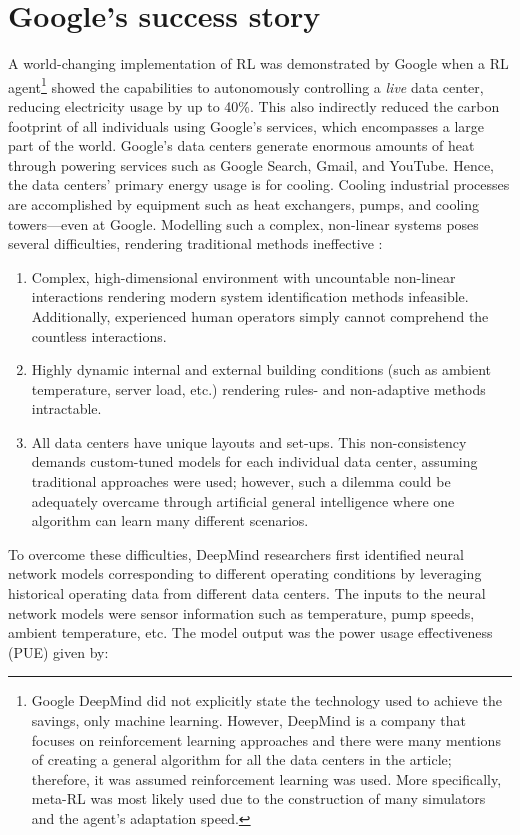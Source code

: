 \section{Google's success story}
A world-changing implementation of RL was demonstrated by Google when a RL agent\footnote{Google DeepMind did not explicitly state the technology used to achieve the savings, only machine learning. However, DeepMind is a company that focuses on reinforcement learning approaches and there were many mentions of creating a general algorithm for all the data centers in the article; therefore, it was assumed reinforcement learning was used. More specifically, meta-RL was most likely used due to the construction of many simulators and the agent's adaptation speed.} showed the capabilities to autonomously controlling a \textit{live} data center, reducing electricity usage by up to 40\%. This also indirectly reduced the carbon footprint of all individuals using Google's services, which encompasses a large part of the world. Google's data centers generate enormous amounts of heat through powering services such as Google Search, Gmail, and YouTube. Hence, the data centers' primary energy usage is for cooling. Cooling industrial processes are accomplished by equipment such as heat exchangers, pumps, and cooling towers---even at Google.  Modelling such a complex, non-linear systems poses several difficulties, rendering traditional methods ineffective \cite{google_data1}:
\begin{enumerate}
    \item Complex, high-dimensional environment with uncountable non-linear interactions rendering modern system identification methods infeasible. Additionally, experienced human operators simply cannot comprehend the countless interactions.
    \item Highly dynamic internal and external building conditions (such as ambient temperature, server load, etc.) rendering rules- and non-adaptive methods intractable.
    \item All data centers have unique layouts and set-ups.  This non-consistency demands custom-tuned models for each individual data center, assuming traditional approaches were used; however, such a dilemma could be adequately overcame through artificial general intelligence where one algorithm can learn many different scenarios.
\end{enumerate}
To overcome these difficulties, DeepMind researchers first identified neural network models corresponding to different operating conditions by leveraging historical operating data from different data centers.  The inputs to the neural network models were sensor information such as temperature, pump speeds, ambient temperature, etc. The model output was the power usage effectiveness (PUE) given by:
